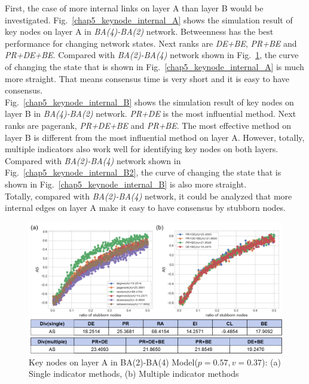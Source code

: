 First, the case of more internal links on layer A than layer B would be investigated. 
Fig.~\ref{chap5_keynode_internal_A} shows the simulation result of key nodes on layer A in \textit{BA(4)-BA(2)} network. Betweenness has the best performance for changing network states. Next ranks are \textit{DE+BE}, \textit{PR+BE} and \textit{PR+DE+BE}. Compared with \textit{BA(2)-BA(4)} network shown in Fig.~\ref{chap5_keynode_internal_A2}, the curve of changing the state that is shown in Fig.~\ref{chap5_keynode_internal_A} is much more straight. That means consensus time is very short and it is easy to have consensus.\\   
Fig.~\ref{chap5_keynode_internal_B} shows the simulation result of key nodes on layer B in \textit{BA(4)-BA(2)} network. \textit{PR+DE} is the most influential method. Next ranks are pagerank, \textit{PR+DE+BE} and \textit{PR+BE}. The most effective method on layer B is different from the most influential method on layer A. However, totally, multiple indicators also work well for identifying key nodes on both layers. Compared with \textit{BA(2)-BA(4)} network shown in Fig.~\ref{chap5_keynode_internal_B2}, the curve of changing the state that is shown in Fig.~\ref{chap5_keynode_internal_B} is also more straight. \\ 
Totally, compared with \textit{BA(2)-BA(4)} network, it could be analyzed that more internal edges on layer A make it easy to have consensus by stubborn nodes. 
\begin{figure}[!htb]
	\centering
	\includegraphics[width=\hsize]{figure/chap5_keynode_internal_A2.png}
	\caption{Key nodes on layer A in BA(2)-BA(4) Model($p=0.57, v=0.37$):
		(a) Single indicator methods, (b) Multiple indicator methods}
	\label{chap5_keynode_internal_A2}
\end{figure}
